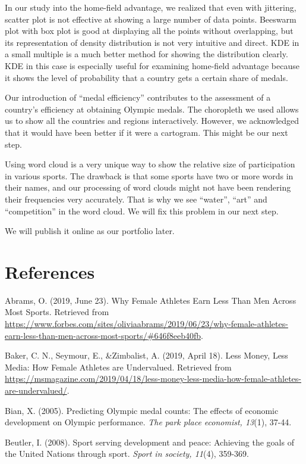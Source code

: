 \documentclass[
]{article}
\begin{document}
In our study into the home-field advantage, we realized that even with jittering, scatter plot is not effective at showing a large number of data points. Beeswarm plot with box plot is good at displaying all the points without overlapping, but its representation of density distribution is not very intuitive and direct. KDE in a small multiple is a much better method for showing the distribution clearly. KDE in this case is especially useful for examining home-field advantage because it shows the level of probability that a country gets a certain share of medals.

Our introduction of ``medal efficiency'' contributes to the assessment of a country's efficiency at obtaining Olympic medals. The choropleth we used allows us to show all the countries and regions interactively. However, we acknowledged that it would have been better if it were a cartogram. This might be our next step.

Using word cloud is a very unique way to show the relative size of participation in various sports. The drawback is that some sports have two or more words in their names, and our processing of word clouds might not have been rendering their frequencies very accurately. That is why we see ``water'', ``art'' and ``competition'' in the word cloud. We will fix this problem in our next step.

We will publish it online as our portfolio later.

\hypertarget{references}{%
\section*{References}\label{references}}

Abrams, O. (2019, June 23). Why Female Athletes Earn Less Than Men Across Most Sports. Retrieved from \url{https://www.forbes.com/sites/oliviaabrams/2019/06/23/why-female-athletes-earn-less-than-men-across-most-sports/\#646f8eeb40fb}.

Baker, C. N., Seymour, E., \&Zimbalist, A. (2019, April 18). Less Money, Less Media: How Female Athletes are Undervalued. Retrieved from \url{https://msmagazine.com/2019/04/18/less-money-less-media-how-female-athletes-are-undervalued/}.

Bian, X. (2005). Predicting Olympic medal counts: The effects of economic development on Olympic performance. \emph{The park place economist, 13}(1), 37-44.

Beutler, I. (2008). Sport serving development and peace: Achieving the goals of the United Nations through sport. \emph{Sport in society, 11}(4), 359-369.
\end{document}
